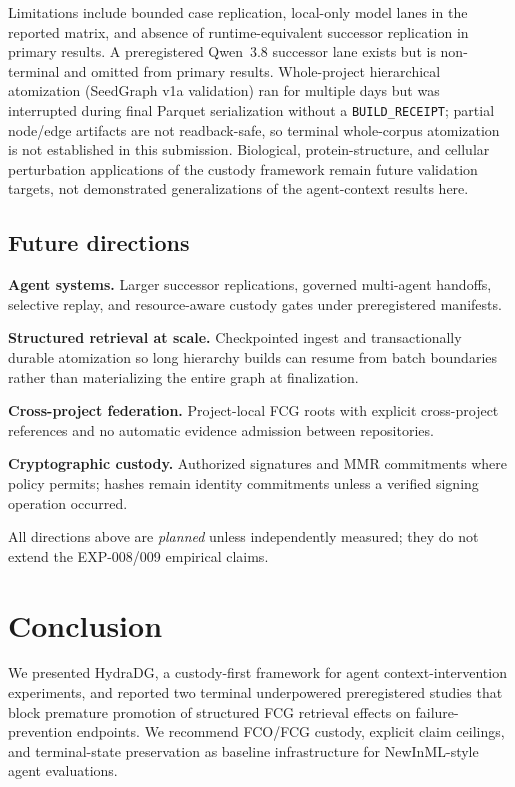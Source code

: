 \documentclass{article}
\begin{document}
Limitations include bounded case replication, local-only model lanes in the reported matrix, and absence of runtime-equivalent successor replication in primary results.
A preregistered Qwen~3.8 successor lane exists but is non-terminal and omitted from primary results.
Whole-project hierarchical atomization (SeedGraph v1a validation) ran for multiple days but was interrupted during final Parquet serialization without a \texttt{BUILD\_RECEIPT}; partial node/edge artifacts are not readback-safe, so terminal whole-corpus atomization is not established in this submission.
Biological, protein-structure, and cellular perturbation applications of the custody framework remain future validation targets, not demonstrated generalizations of the agent-context results here.

\subsection{Future directions}

\textbf{Agent systems.} Larger successor replications, governed multi-agent handoffs, selective replay, and resource-aware custody gates under preregistered manifests.

\textbf{Structured retrieval at scale.} Checkpointed ingest and transactionally durable atomization so long hierarchy builds can resume from batch boundaries rather than materializing the entire graph at finalization.

\textbf{Cross-project federation.} Project-local FCG roots with explicit cross-project references and no automatic evidence admission between repositories.

\textbf{Cryptographic custody.} Authorized signatures and MMR commitments where policy permits; hashes remain identity commitments unless a verified signing operation occurred.

All directions above are \emph{planned} unless independently measured; they do not extend the EXP-008/009 empirical claims.

\section{Conclusion}

We presented HydraDG, a custody-first framework for agent context-intervention experiments, and reported two terminal underpowered preregistered studies that block premature promotion of structured FCG retrieval effects on failure-prevention endpoints.
We recommend FCO/FCG custody, explicit claim ceilings, and terminal-state preservation as baseline infrastructure for NewInML-style agent evaluations.
\end{document}
